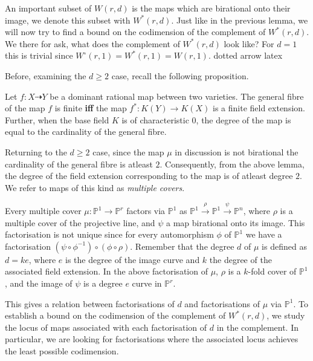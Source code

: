 An important subset of $W(r,d)$ is the maps which are birational onto their image, we denote this subset with $W^{*}(r,d)$.
Just like in the previous lemma, we will now try to find a bound on the codimension of the complement of $W^{*}(r,d)$. 
We there for ask, what does the complement of $W^{*}(r,d)$ look like?
For $d=1$ this is trivial since $W^{\circ}(r,1) = W^{*}(r,1) =  W(r,1)$.
dotted arrow latex
\par Before, examining the $d \geq 2$ case, recall the following proposition.
\begin{proposition}[\textcolor{red}{Cite 7.16 from Harris}]
    Let $f: X \dashrightarrow Y$ be a dominant rational map between two varieties. 
    The general fibre of the map $f$ is finite \textbf{iff} the map $f^{*}: K(Y) \to K(X)$ is a finite field extension.
    Further, when the base field $K$ is of characteristic $0$, the degree of the map is equal to the cardinality of the general fibre.
\end{proposition}

Returning to the $d \geq 2$ case, since the map $\mu$ in discussion is not birational the cardinality of the general fibre is atleast $2$.
Consequently, from the above lemma, the degree of the field extension corresponding to the map is of atleast degree $2$.
We refer to maps of this kind as \textit{multiple covers}.
\par Every multiple cover $\mu: \mathbb{P}^{1} \to \mathbb{P}^{r}$ factors via $\mathbb{P}^{1}$ as $\mathbb{P}^{1} \xrightarrow{\rho} \mathbb{P}^{1} \xrightarrow{\psi} \mathbb{P}^{n} $, where $\rho$ is a multiple cover of the projective line, and $\psi$ a map birational onto its image.
This factorisation is not unique since for every automorphism $\phi$ of $\mathbb{P}^{1}$ we have a factorisation $(\psi \circ \phi^{-1}) \circ (\phi \circ \rho)$. 
Remember that the degree $d$ of $\mu$ is defined as $d = ke$, where $e$ is the degree of the image curve and $k$ the degree of the associated field extension.
In the above factorisation of $\mu$, $\rho$ is a $k$-fold cover of $\mathbb{P}^{1}$, and the image of $\psi$ is a degree $e$ curve in $\mathbb{P}^{r}$.
\par This gives a relation between factorisations of $d$ and factorisations of $\mu$ via $\mathbb{P}^{1}$. 
To establish a bound on the codimension of the complement of $W^{*}(r,d)$, we study the locus of maps associated with each factorisation of $d$ in the complement.
In particular, we are looking for factorisations where the associated locus achieves the least possible codimension.

